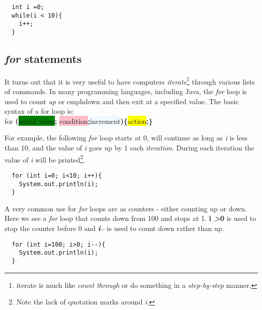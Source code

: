 \documentclass{article}
\begin{document}
\begin{flushleft}
\begin{verbatim}
  int i =0; 
  while(i < 10){
    i++; 
  }
\end{verbatim}

\subsection{\emph{for} statements}
It turns out that it is very useful to have computers \emph{iterate}\footnote{iterate is much like \emph{count through} or do something in a \emph{step-by-step} manner.} through various lists of commands. In many programming languages, including Java, the \emph{for} loop is used to count \emph{up} or emph{down} and then exit at a specified value. The basic syntax of a for loop is: \\ \colorbox{bananamania}{for} \textbf{(}\colorbox{green}{initial value}\textbf{;} \colorbox{pink}{condition}\textbf{;}\colorbox{aliceblue}{increment}\textbf{)}\textbf{\{}\colorbox{yellow}{action}\textbf{;}\textbf{\}} \par

For example, the following \emph{for} loop starts at 0, will continue as long as \emph{i} is less than 10, and the value of \emph{i} goes up by 1 each \emph{iteration}. During each iteration the value of \emph{i} will be printed\footnote{Note the lack of quotation marks around \emph{i}.}.
\begin{verbatim}
  for (int i=0; i<10; i++){
    System.out.println(i);
  }
\end{verbatim}

A very common use for \emph{for} loops are as counters - either counting up or down. Here we see a \emph{for} loop that counts down from 100 and stops at 1. \textbf{i \emph{>}0} is used to stop the counter before 0 and \emph{\textbf{i--}} is used to count down rather than up.
\begin{verbatim}
  for (int i=100; i>0; i--){
    System.out.println(i);
  }
\end{verbatim}




\end{flushleft}
\end{document}
